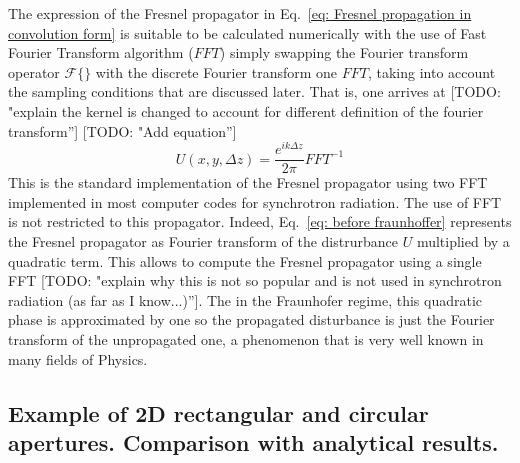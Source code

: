 \documentclass{iucr}              %
\newcommand{\todo}[1]{{\color{red}[TODO: "#1'']}}
\begin{document}
The expression of the Fresnel propagator in Eq.~\ref{eq: Fresnel propagation in convolution form} is suitable to be calculated numerically with the use of Fast Fourier Transform algorithm ($FFT$) simply swapping the Fourier transform operator $\mathcal{F}\big\{\big\}$ with the discrete Fourier transform one $FFT$, taking into account the sampling conditions that are discussed later. That is, one arrives at \todo{explain the kernel is changed to account for different definition of the fourier transform} \todo{Add equation}
\begin{equation}\label{eq: standard propagator}
U(x, y, \Delta z)= \frac{e^{ik\Delta z}}{2\pi} FFT^{-1} 
\end{equation} 
This is the standard implementation of the Fresnel propagator using two FFT implemented in most computer codes for synchrotron radiation. The use of FFT is not restricted to this propagator. Indeed, Eq.~\ref{eq: before fraunhoffer} represents the Fresnel propagator as Fourier transform of the distrurbance $U$ multiplied by a quadratic term. This allows to compute the Fresnel propagator using a single FFT \todo{explain why this is not so popular and is not used in synchrotron radiation (as far as I know...)}. The in the Fraunhofer regime, this quadratic phase is approximated by one so the propagated disturbance is just the Fourier transform of the unpropagated one, a phenomenon that is very well known in many fields of Physics. 


\subsection{Example of 2D rectangular and circular apertures. Comparison with analytical results.}
\label{subch: apertures}
\end{document}
